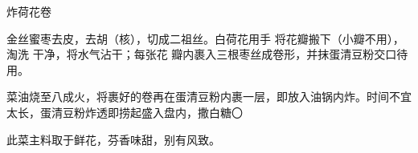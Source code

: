 \begin{recipe}{炸荷花卷}

\ingredients


\cooking

金丝蜜枣去皮，去胡（核），切成二祖丝。白荷花用手 将花瓣搬下（小瓣不用），淘洗
干净，将水气沾干；每张花 瓣内裹入三根枣丝成卷形，并抹蛋清豆粉交口待用。

\step 菜油烧至八成火，将裹好的卷再在蛋清豆粉内裹一层，即放入油锅内炸。时间不宜
太长，蛋清豆粉炸透即捞起盛入盘内，撒白糖〇

\features

此菜主料取于鲜花，芬香味甜，别有风致。

\end{recipe}

